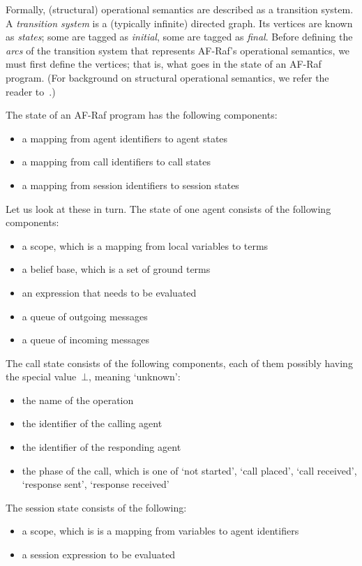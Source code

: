 \documentclass[a4paper,12pt,oneside,fleqn]{book} %
\begin{document}
Formally, (structural) operational semantics are described as a transition
system. A \emph{transition system} is a (typically infinite) directed
graph. Its vertices are known as \emph{states}; some are tagged as
\emph{initial}, some are tagged as \emph{final}. Before defining the
\emph{arcs} of the transition system that represents AF-Raf's operational
semantics, we must first define the vertices; that is, what goes in the
state of an AF-Raf program. (For background on structural operational
semantics, we refer the reader to~\cite[Section~5.2]{harper2012}.)

The state of an AF-Raf program has the following components:
\begin{itemize}
\item a mapping from agent identifiers to agent states
\item a mapping from call identifiers to call states
\item a mapping from session identifiers to session states
\end{itemize}
Let us look at these in turn. The state of one agent consists of the
following components:
\begin{itemize}
\item a scope, which is a mapping from local variables to terms
\item a belief base, which is a set of ground terms
\item an expression that needs to be evaluated
\item a queue of outgoing messages
\item a queue of incoming messages
\end{itemize}
The call state consists of the following components, each of them possibly
having the special value~$\bot$, meaning `unknown':
\begin{itemize}
\item the name of the operation
\item the identifier of the calling agent
\item the identifier of the responding agent
\item the phase of the call, which is one of `not started', `call placed',
`call received', `response sent', `response received'
\end{itemize}
The session state consists of the following:
\begin{itemize}
\item a scope, which is is a mapping from variables to agent identifiers
\item a session expression to be evaluated
\end{itemize}
\end{document}
